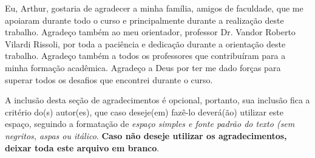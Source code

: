 \begin{agradecimentos}

    Eu, Arthur, gostaria de agradecer a minha família, amigos de faculdade, que me apoiaram durante todo o curso e principalmente durante a realização deste trabalho. Agradeço também ao meu orientador, professor Dr. Vandor Roberto Vilardi Rissoli, por toda a paciência e dedicação durante a orientação deste trabalho. Agradeço também a todos os professores que contribuíram para a minha formação acadêmica. Agradeço a Deus por ter me dado forças para superar todos os desafios que encontrei durante o curso.
    
    
    A inclusão desta seção de agradecimentos é opcional, portanto, sua inclusão 
    fica a critério do(s) autor(es), que caso deseje(em) fazê-lo deverá(ão) 
    utilizar este espaço, seguindo a formatação de \textit{espaço simples e 
    fonte padrão do texto (sem negritos, aspas ou itálico}.
    \textbf{Caso não deseje utilizar os agradecimentos, deixar toda este arquivo
    em branco}.
    \end{agradecimentos}